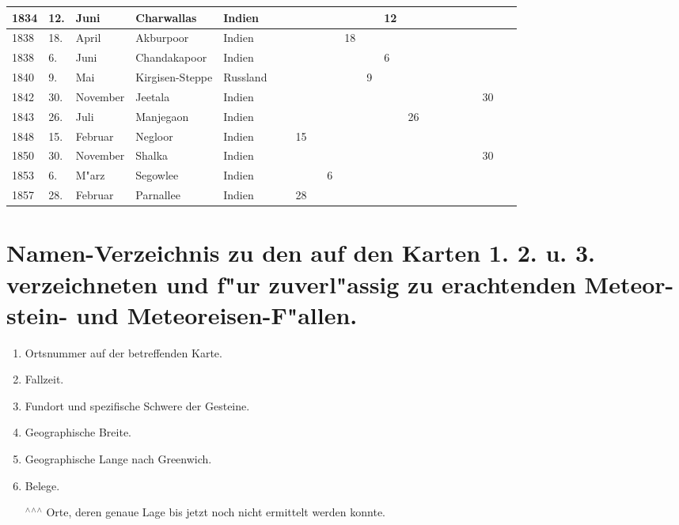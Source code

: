 \documentclass[a4paper, 8pt, oneside, polutonikogreek, german]{article}
\begin{document}
\begin{landscape}
\begin{table}[H]
\begin{longtable}{|l|l|l|l|l|l|l|l|l|l|l|l|l|l|l|l|l|}
        1834 & 12. & Juni & Charwallas & Indien & ~ & ~ & ~ & ~ & ~ & 12 & ~ & ~ & ~ & ~ & ~ & ~ \\ \hline
        1838 & 18. & April & Akburpoor & Indien & ~ & ~ & ~ & 18 & ~ & ~ & ~ & ~ & ~ & ~ & ~ & ~ \\ \hline
        1838 & 6. & Juni & Chandakapoor & Indien & ~ & ~ & ~ & ~ & ~ & 6 & ~ & ~ & ~ & ~ & ~ & ~ \\ \hline
        1840 & 9. & Mai & Kirgisen-Steppe & Russland & ~ & ~ & ~ & ~ & 9 & ~ & ~ & ~ & ~ & ~ & ~ & ~ \\ \hline
        1842 & 30. & November & Jeetala & Indien & ~ & ~ & ~ & ~ & ~ & ~ & ~ & ~ & ~ & ~ & 30 & ~ \\ \hline
        1843 & 26. & Juli & Manjegaon & Indien & ~ & ~ & ~ & ~ & ~ & ~ & 26 & ~ & ~ & ~ & ~ & ~ \\ \hline
        1848 & 15. & Februar & Negloor & Indien & ~ & 15 & ~ & ~ & ~ & ~ & ~ & ~ & ~ & ~ & ~ & ~ \\ \hline
        1850 & 30. & November & Shalka & Indien & ~ & ~ & ~ & ~ & ~ & ~ & ~ & ~ & ~ & ~ & 30 & ~ \\ \hline
        1853 & 6. & M"arz & Segowlee & Indien & ~ & ~ & 6 & ~ & ~ & ~ & ~ & ~ & ~ & ~ & ~ & ~ \\ \hline
        1857 & 28. & Februar & Parnallee & Indien & ~ & 28 ~ & ~ & ~ & ~ & ~ & ~ & ~ & ~ & ~ & ~ & ~ \\ \hline
    \end{longtable}
\end{table}
\vspace*{\fill}
\end{landscape}
\clearpage
\section[Namen-Verzeichnis zu den auf den Karten 1. 2. u. 3. verzeichneten und f"ur zuverl"assig zu erachtenden Meteorstein- und Meteoreisen-F"allen.]{Namen-Verzeichnis zu den auf den Karten 1. 2. u. 3. verzeichneten und f"ur zuverl"assig zu erachtenden Meteor- stein- und Meteoreisen-F"allen.}
\begin{enumerate}
    \item Ortsnummer auf der betreffenden Karte.
    \item Fallzeit.
    \item Fundort und spezifische Schwere der Gesteine.
    \item Geographische Breite.
    \item Geographische Lange nach Greenwich.
    \item Belege.
    \item[$^\wedge$$^\wedge$$^\wedge$] Orte, deren genaue Lage bis jetzt noch nicht ermittelt werden konnte.
\end{enumerate}
\clearpage
\end{document}
